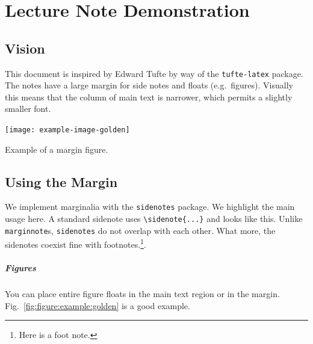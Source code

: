 \documentclass[12pt, oneside]{report}    %
\let\oldchapter\chapter
\def\chapter{%
  \setcounter{sidenote}{1}%
  \oldchapter
}
\begin{document}
\chapter{Lecture Note Demonstration} %


\section{Vision}

This document is inspired by Edward Tufte by way of the \texttt{tufte-latex} package. The notes have a large margin for side notes and floats (e.g.\ figures).  Visually this means that the column of main text is narrower, which permits a slightly smaller font.\begin{marginfigure}%
    \texttt{[image: example-image-golden]}
    \caption{Example of a margin figure.}
    \label{fig:figure:example:golden}
\end{marginfigure}


\section{Using the Margin}

We implement marginalia with the \texttt{sidenotes} package. We highlight the main usage here. A standard sidenote uses \verb!\sidenote{...}! and looks like this. Unlike \verb!marginnote!s, \verb!sidenotes! do not overlap with each other. What more, the sidenotes coexist fine with footnotes.\footnote{Here is a foot note.}.

\paragraph{Figures} You can place entire figure floats in the main text region or in the margin. Fig.~\ref{fig:figure:example:golden} is a good example.
\end{document}
